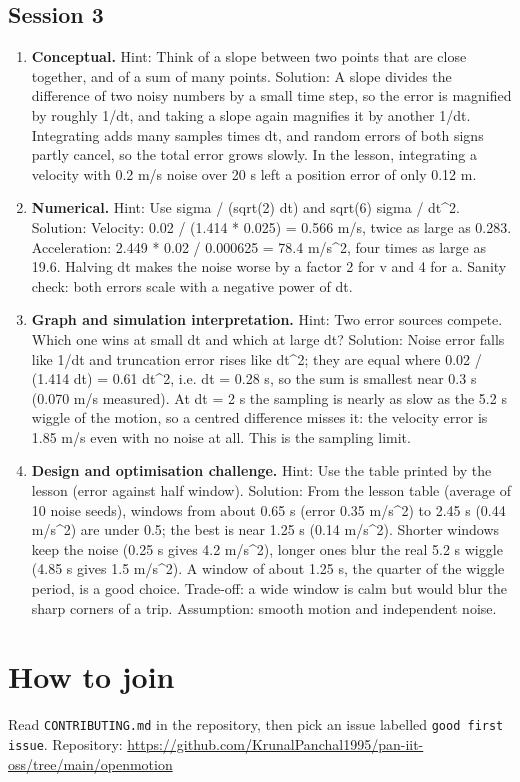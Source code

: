 \documentclass[11pt,a4paper]{article}
\begin{document}
\subsection*{Session 3}
\begin{enumerate}[nosep]
\item \textbf{Conceptual.} Hint: Think of a slope between two points that are close together, and of a sum of many points. Solution: A slope divides the difference of two noisy numbers by a small time step, so the error is magnified by roughly 1/dt, and taking a slope again magnifies it by another 1/dt. Integrating adds many samples times dt, and random errors of both signs partly cancel, so the total error grows slowly. In the lesson, integrating a velocity with 0.2 m/s noise over 20 s left a position error of only 0.12 m.
\item \textbf{Numerical.} Hint: Use sigma / (sqrt(2) dt) and sqrt(6) sigma / dt\textasciicircum{}2. Solution: Velocity: 0.02 / (1.414 * 0.025) = 0.566 m/s, twice as large as 0.283. Acceleration: 2.449 * 0.02 / 0.000625 = 78.4 m/s\textasciicircum{}2, four times as large as 19.6. Halving dt makes the noise worse by a factor 2 for v and 4 for a. Sanity check: both errors scale with a negative power of dt.
\item \textbf{Graph and simulation interpretation.} Hint: Two error sources compete. Which one wins at small dt and which at large dt? Solution: Noise error falls like 1/dt and truncation error rises like dt\textasciicircum{}2; they are equal where 0.02 / (1.414 dt) = 0.61 dt\textasciicircum{}2, i.e. dt = 0.28 s, so the sum is smallest near 0.3 s (0.070 m/s measured). At dt = 2 s the sampling is nearly as slow as the 5.2 s wiggle of the motion, so a centred difference misses it: the velocity error is 1.85 m/s even with no noise at all. This is the sampling limit.
\item \textbf{Design and optimisation challenge.} Hint: Use the table printed by the lesson (error against half window). Solution: From the lesson table (average of 10 noise seeds), windows from about 0.65 s (error 0.35 m/s\textasciicircum{}2) to 2.45 s (0.44 m/s\textasciicircum{}2) are under 0.5; the best is near 1.25 s (0.14 m/s\textasciicircum{}2). Shorter windows keep the noise (0.25 s gives 4.2 m/s\textasciicircum{}2), longer ones blur the real 5.2 s wiggle (4.85 s gives 1.5 m/s\textasciicircum{}2). A window of about 1.25 s, the quarter of the wiggle period, is a good choice. Trade-off: a wide window is calm but would blur the sharp corners of a trip. Assumption: smooth motion and independent noise.
\end{enumerate}

\section{How to join}
Read \texttt{CONTRIBUTING.md} in the repository, then pick an issue labelled \texttt{good first issue}. Repository: \url{https://github.com/KrunalPanchal1995/pan-iit-oss/tree/main/openmotion}
\end{document}
